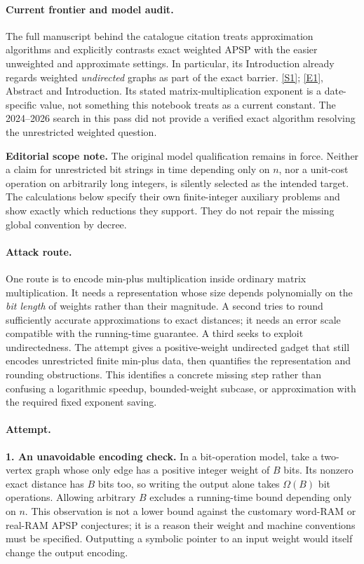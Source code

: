 \documentclass[11pt,a4paper]{article}
\newcommand{\sref}[2]{\hyperlink{source:#1:#2}{[S#2]}}
\newcommand{\eref}[2]{\hyperlink{extra:#1:#2}{[E#2]}}
\numberwithin{equation}{section}
\begin{document}
\paragraph{Current frontier and model audit.}
The full manuscript behind the catalogue citation treats approximation
algorithms and explicitly contrasts exact weighted APSP with the easier
unweighted and approximate settings. In particular, its Introduction
already regards weighted \emph{undirected} graphs as part of the exact
barrier. \sref{232}{1}; \eref{232}{1}, Abstract and Introduction.
Its stated matrix-multiplication exponent is a date-specific value, not
something this notebook treats as a current constant. The 2024--2026
search in this pass did not provide a verified exact algorithm resolving
the unrestricted weighted question.

\textbf{Editorial scope note.} The original model qualification remains
in force. Neither a claim for unrestricted bit strings in time depending
only on $n$, nor a unit-cost operation on arbitrarily long integers, is
silently selected as the intended target. The calculations below specify
their own finite-integer auxiliary problems and show exactly which
reductions they support. They do not repair the missing global convention
by decree.

\paragraph{Attack route.}
One route is to encode min-plus multiplication inside ordinary matrix
multiplication. It needs a representation whose size depends polynomially
on the \emph{bit length} of weights rather than their magnitude. A second
tries to round sufficiently accurate approximations to exact distances;
it needs an error scale compatible with the running-time guarantee. A
third seeks to exploit undirectedness. The attempt gives a positive-weight
undirected gadget that still encodes unrestricted finite min-plus data,
then quantifies the representation and rounding obstructions. This
identifies a concrete missing step rather than confusing a logarithmic
speedup, bounded-weight subcase, or approximation with the required fixed
exponent saving.

\paragraph{Attempt.}
\textbf{1. An unavoidable encoding check.}
In a bit-operation model, take a two-vertex graph whose only edge has a
positive integer weight of $B$ bits. Its nonzero exact distance has $B$
bits too, so writing the output alone takes $\Omega(B)$ bit operations.
Allowing arbitrary $B$ excludes a running-time bound depending only on
$n$. This observation is not a lower bound against the customary
word-RAM or real-RAM APSP conjectures; it is a reason their weight and
machine conventions must be specified. Outputting a symbolic pointer to
an input weight would itself change the output encoding.
\end{document}
